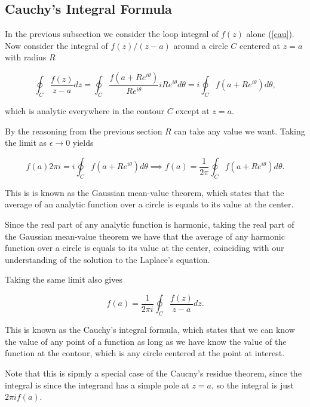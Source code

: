 \documentclass[english,a4paper,12pt]{report}
\begin{document}


\subsection{Cauchy's Integral Formula} 

In the previous subsection we consider the loop integral of \(f(z)\) alone (\cref{cau}). Now consider the integral of \(f(z) /(z-a)\) around a circle \(C\) centered at \(z = a\) with radius \(R\) 

\begin{equation}
    \oint_{C} \frac{f(z)}{z-a}dz = \oint_{C} \frac{f(a+Re^{i \theta } )}{R e^{i \theta } } i Re^{i \theta } d \theta = i \oint_{C} f(a + Re^{i \theta } ) d \theta ,
\end{equation}

which is analytic everywhere in the contour \(C\) except at \(z = a\). 

By the reasoning from the previous section \(R\) can take any value we want. Taking the limit as \(\epsilon \to 0\) yields 

\begin{equation}
    f(a)2\pi i = i \oint_{C} f(a+Re^{i \theta } )d \theta \implies f(a) = \frac{1}{2\pi } \oint_{C} f(a+Re^{i \theta } ) d \theta . 
\end{equation}

This is is known as the Gaussian mean-value theorem, which states that the average of an analytic function over a circle is equals to its value at the center.

Since the real part of any analytic function is harmonic, taking the real part of the Gaussian mean-value theorem we have that the average of any harmonic function over a circle is equals to its value at the center, coinciding with our understanding of the solution to the Laplace's equation.

Taking the same limit also gives

\begin{equation}
   f(a) =  \frac{1}{2\pi i}  \oint_{C} \frac{f(z)}{z-a} dz .  \label{cau2} 
\end{equation}

This is known as the Cauchy's integral formula, which states that we can know the value of any point of a function as long as we have know the value of the function at the contour, which is any circle centered at the point at interest.

Note that this is sipmly a special case of the Caucny's residue theorem, since the integral is since the integrand has a simple pole at \(z = a\), so the integral is just \(2\pi i f(a)\).   
\end{document}
